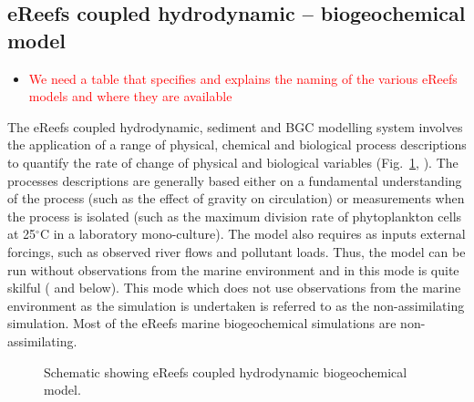 \subsection{eReefs coupled hydrodynamic -- biogeochemical model}

\begin{itemize}
\item \textcolor{red}{We need a table that specifies and explains the naming of the various
    eReefs models and where they are available}
\end{itemize}

The eReefs coupled hydrodynamic, sediment and BGC modelling system involves the application of a
range of physical, chemical and biological process descriptions to quantify the rate of change of
physical and biological variables (Fig.~\ref{fig:bgc}, \citet{Schiller14}). The processes
descriptions are generally based either on a fundamental understanding of the process (such as the
effect of gravity on circulation) or measurements when the process is isolated (such as the maximum
division rate of phytoplankton cells at 25$^{\circ}$C in a laboratory mono-culture). The model also
requires as inputs external forcings, such as observed river flows and pollutant loads. Thus, the
model can be run without observations from the marine environment and in this mode is quite skilful
(\citet{Skerratt18} and below). This mode which does not use observations from the marine
environment as the simulation is undertaken is referred to as the non-assimilating simulation. Most
of the eReefs marine biogeochemical simulations are non-assimilating.

\begin{figure}[thb]
\begin{center}
\caption{Schematic showing eReefs coupled hydrodynamic biogeochemical model.}
\label{fig:bgc}
\end{center}
\end{figure}

